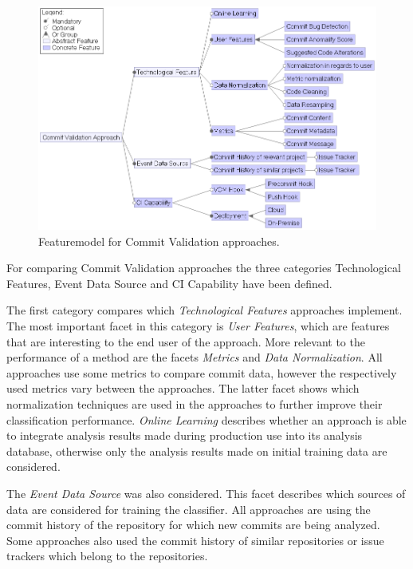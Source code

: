\begin{figure}[t]
	\centering
	\includegraphics[width=15cm]{images/featuremodel}
	\caption{Featuremodel for Commit Validation approaches.}
	\label{fig:featuremodel}
\end{figure}

For comparing Commit Validation approaches the three categories Technological Features, Event Data Source and CI Capability have been defined.

The first category compares which \textit{Technological Features} approaches implement. The most important facet in this category is \textit{User Features}, which are features that are interesting to the end user of the approach. 
More relevant to the performance of a method are the facets \textit{Metrics} and \textit{Data Normalization}. All approaches use some metrics to compare commit data, however the respectively used metrics vary between the approaches.
The latter facet shows which normalization techniques are used in the approaches to further improve their classification performance.
\textit{Online Learning} describes whether an approach is able to integrate analysis results made during production use into its analysis database, otherwise only the analysis results made on initial training data are considered. 

The \textit{Event Data Source} was also considered. This facet describes which sources of data are considered for training the classifier. All approaches are using the commit history of the repository for which new commits are being analyzed. Some approaches also used the commit history of similar repositories or issue trackers which belong to the repositories.

